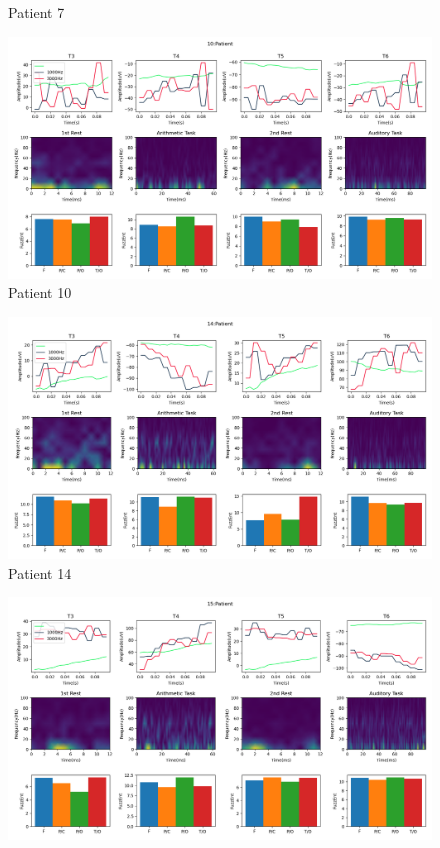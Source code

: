 \documentclass[10pt]{article}
\begin{document}
\begin{landscape}
\begin{figure}
  \caption{Patient 7}
  \label{fig:patient_7}
\end{figure}
\clearpage
\begin{figure}
  \includegraphics[width=7.2in]{figures/10.png}
  \caption{Patient 10}
  \label{fig:patient_10}
\end{figure}
\clearpage
\begin{figure}
  \includegraphics[width=7.2in]{figures/14.png}
  \caption{Patient 14}
  \label{fig:patient_14}
\end{figure}
\clearpage
\begin{figure}
  \includegraphics[width=7.2in]{figures/15.png}

\end{figure}
\end{landscape}
\end{document}
